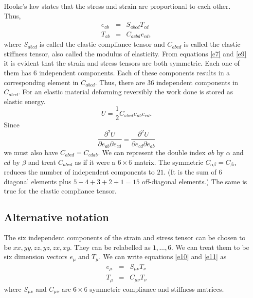 \documentclass{article}
\begin{document}
Hooke's law states that the stress and strain are proportional to each other.
Thus,
\begin{eqnarray}
e_{ab} &=& S_{abcd}T_{cd}  \label{e10} \\
T_{ab} &=& C_{acbd}e_{cd}, \label{e11}
\end{eqnarray}
where $S_{abcd}$ is called the elastic compliance tensor and $C_{abcd}$ is 
called the elastic stiffness tensor, also called the modulus of elasticity.
From equations \eqref{e7} and \eqref{e9} it is evident that the strain and
stress tensors are both symmetric. Each one of them has $6$ independent 
components. Each of these components results in a corresponding element in 
$C_{abcd}$. Thus, there are $36$ independent components in $C_{abcd}$. For an
elastic material deforming reversibly the work done is stored as elastic energy.
\[
U = \frac{1}{2} C_{abcd}e_{ab}e_{cd}.
\]
Since
\[
\frac{\partial^2 U}{\partial e_{ab}\partial e_{cd}} = \frac{\partial^2 U}
{\partial e_{cd}\partial e_{ab}}
\]
we must also have $C_{abcd} = C_{cdab}$. We can represent the double index
$ab$ by $\alpha$ and $cd$ by $\beta$ and treat $C_{abcd}$ as if it were a 
$6 \times 6$ matrix. The symmetric $C_{\alpha\beta} = C_{\beta\alpha}$ reduces
the number of independent components to $21$. (It is the sum of $6$ diagonal
elements plus $5 + 4 + 3 + 2 + 1 = 15$ off-diagonal elements.) The same is true
for the elastic compliance tensor.

\subsection{Alternative notation}
The six independent components of the strain and stress tensor can be chosen to
be $xx, yy, zz, yz, zx, xy$. They can be relabelled as $1, \ldots, 6$. We can
treat them to be six dimension vectors $e_\mu$ and $T_\mu$. We can write 
equations \eqref{e10} and \eqref{e11} as
\begin{eqnarray}
e_\mu &=& S_{\mu\nu}T_\nu \label{e12} \\
T_\mu &=& C_{\mu\nu}T_\nu \label{e13}
\end{eqnarray}
where $S_{\mu\nu}$ and $C_{\mu\nu}$ are $6 \times 6$ symmetric compliance and 
stiffness matrices.
\end{document}

